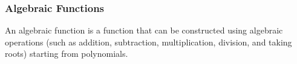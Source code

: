 \begin{frame}
\frametitle{Algebraic Functions}
\begin{definition}
An algebraic function is a function that can be constructed using algebraic operations (such as addition, subtraction, multiplication, division, and taking roots) starting from polynomials.
\end{definition}
\end{frame}
